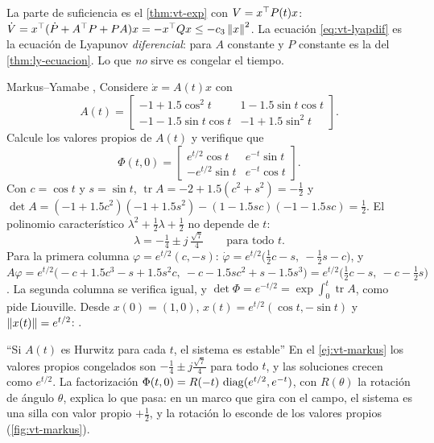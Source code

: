 La parte de suficiencia es el \cref{thm:vt-exp} con $V=x^{\top} P(t)x$: $\dot V=x^{\top}(\dot P+A^{\top} P+PA)x=-x^{\top} Qx\le-c_3\left\lVert x\right\rVert^2$. La ecuación \eqref{eq:vt-lyapdif} es la ecuación de Lyapunov \emph{diferencial}: para $A$ constante y $P$ constante es la del \cref{thm:ly-ecuacion}. Lo que \emph{no} sirve es congelar el tiempo.

\begin{ejemplo}[label=ej:vt-markus]{Markus--Yamabe \citep{MaYa60}, \citep[\S4.6]{Kha02}}
Considere $\dot x=A(t)x$ con
\[
  A(t)=\begin{bmatrix}-1+1.5\cos^2t & 1-1.5\sin t\cos t\\[2pt] -1-1.5\sin t\cos t & -1+1.5\sin^2t\end{bmatrix} .
\]
Calcule los valores propios de $A(t)$ y verifique que
\[
  \Phi(t,0)=\begin{bmatrix}e^{t/2}\cos t & e^{-t}\sin t\\ -e^{t/2}\sin t & e^{-t}\cos t\end{bmatrix} .
\]
\solucion Con $c=\cos t$ y $s=\sin t$, $\operatorname{tr}A=-2+1.5(c^2+s^2)=-\tfrac12$ y $\det A=(-1+1.5c^2)(-1+1.5s^2)-(1-1.5sc)(-1-1.5sc)=\tfrac12$. El polinomio característico $\lambda^2+\tfrac12\lambda+\tfrac12$ no depende de $t$:
\[
  \lambda=-\tfrac14\pm j\,\tfrac{\sqrt7}4\qquad\text{para todo }t .
\]
Para la primera columna $\varphi=e^{t/2}(c,-s)$: $\dot\varphi=e^{t/2}\bigl(\tfrac12c-s,\ -\tfrac12s-c\bigr)$, y $A\varphi=e^{t/2}\bigl(-c+1.5c^3-s+1.5s^2c,\ -c-1.5sc^2+s-1.5s^3\bigr)=e^{t/2}\bigl(\tfrac12c-s,\ -c-\tfrac12s\bigr)$. La segunda columna se verifica igual, y $\det\Phi=e^{-t/2}=\exp\int_0^t\operatorname{tr}A$, como pide Liouville. Desde $x(0)=(1,0)$, $x(t)=e^{t/2}(\cos t,-\sin t)$ y $\left\lVert x(t)\right\rVert=e^{t/2}$: .
\end{ejemplo}

\begin{trampa}[label=tr:vt-congelar]{``Si $A(t)$ es Hurwitz para cada $t$, el sistema es estable''}
En el \cref{ej:vt-markus} los valores propios congelados son $-\tfrac14\pm j\tfrac{\sqrt7}4$ para todo $t$, y las soluciones crecen como $e^{t/2}$. La factorización $\Phi(t,0)=R(-t)\,\operatorname{diag}(e^{t/2},e^{-t})$, con $R(\theta)$ la rotación de ángulo $\theta$, explica lo que pasa: en un marco que gira con el campo, el sistema es una silla con valor propio $+\tfrac12$, y la rotación lo esconde de los valores propios (\cref{fig:vt-markus}).
\end{trampa}

